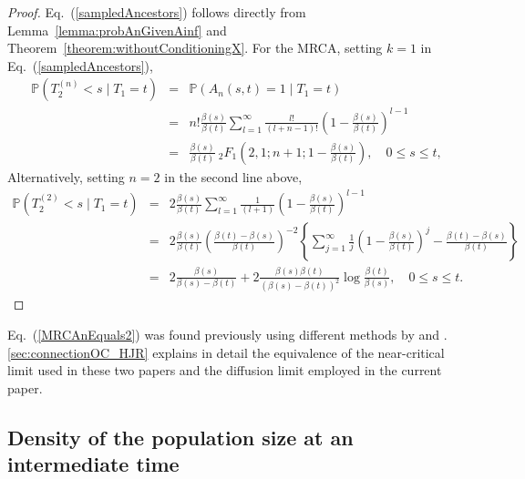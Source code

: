 \documentclass[preprint,12pt]{elsarticle}
\begin{document}
\begin{proof}
Eq.~(\ref{sampledAncestors}) follows directly from Lemma~\ref{lemma:probAnGivenAinf} and Theorem~\ref{theorem:withoutConditioningX}.  
For the MRCA, setting $k = 1$ in Eq.~(\ref{sampledAncestors}), 
\begin{eqnarray*}	
\mathbb{P}(T_2^{(n)} < s\mid T_1 = t) & = & \mathbb{P}(A_n(s, t) = 1 \mid  T_1 = t) \nonumber \\
	& = & n! \frac{\beta(s)}{\beta(t)} \sum_{l = 1}^\infty \frac{l!}{(l + n - 1)!} \left(1 - \frac{\beta(s)}{\beta(t)}\right)^{l - 1} \nonumber \\
	& = & \frac{\beta(s)}{\beta(t)}~_2F_1\left(2, 1; n + 1; 1 - \frac{\beta(s)}{\beta(t)}\right), \quad 0 \le s \le t, 
\end{eqnarray*}	
Alternatively, setting $n = 2$ in the second line above, 
\begin{eqnarray*}	
\mathbb{P}(T_2^{(2)} < s\mid T_1 = t) & = & 2 \frac{\beta(s)}{\beta(t)} \sum_{l = 1}^\infty \frac{1}{(l + 1)} \left(1 - \frac{\beta(s)}{\beta(t)}\right)^{l - 1} \nonumber \\
	& = & 2 \frac{\beta(s)}{\beta(t)}\left(\frac{\beta(t) - \beta(s)}{\beta(t)}\right)^{-2} 
				\left\{\sum_{j = 1}^\infty \frac{1}{j}   \left(1 - \frac{\beta(s)}{\beta(t)}\right)^j - \frac{\beta(t) - \beta(s)}{\beta(t)} \right\}  \nonumber \\
	& = & 2\frac{\beta(s)}{\beta(s) - \beta(t)} + 2\frac{\beta(s)\beta(t)}{(\beta(s) - \beta(t))^2} \log\frac{\beta(t)}{\beta(s)}, \quad 0 \le s \le t.  
\end{eqnarray*}	
\end{proof}
Eq.~(\ref{MRCAnEquals2}) was found previously using different methods by \citet[Theorem~2.3 with $x = 1$]{o1995genealogy} and \citet[p1369]{Harris20}.  
\ref{sec:connectionOC_HJR} explains in detail the equivalence of the near-critical limit used in these two papers and the diffusion limit employed in the current paper.  

%
%
\subsection{Density of the population size at an intermediate time}
\end{document}
